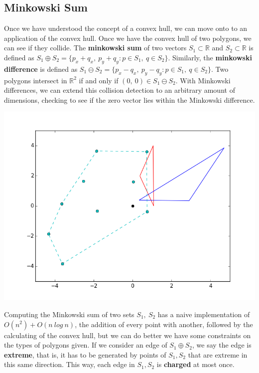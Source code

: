\documentclass[10pt]{article}
\begin{document}
\begin{multicols}{2}
\subsection{Minkowski Sum}
\indent Once we have understood the concept of a convex hull, we can move onto to an application of the convex hull. Once we have the convex hull of two polygons, we can see if they collide. The \textbf{minkowski sum} of two vectors $S_1 \subset \mathbb{R}$ and $S_2 \subset \mathbb{R}$ is defined as $S_1 \oplus S_2 = \{p_x + q_x,\ p_y + q_y : p \in S_1,\ q \in S_2\}$. Similarly, the \textbf{minkowski difference} is defined as $S_1 \ominus S_2 = \{p_x - q_x,\ p_y - q_y : p \in S_1,\ q \in S_2\}$. Two polygons intersect in $\mathbb{R}^2$ if and only if $(0,\ 0) \in S_1 \ominus S_2$. With Minkowski differences, we can extend this collision detection to an arbitrary amount of dimensions, checking to see if the zero vector lies within the Minkowski difference.
\centerline{\includegraphics[scale=0.4]{minkowski_colliding.png}} 
\indent Computing the Minkowski sum of two sets $S_1,\ S_2$ has a naive implementation of $O(n^2) + O(n\ log\ n)$, the addition of every point with another, followed by the calculating of the convex hull, but we can do better we have some constraints on the types of polygons given. If we consider an edge of $S_1 \oplus S_2$, we say the edge is \textbf{extreme}, that is, it has to be generated by points of $S_1, S_2$ that are extreme in this same direction. This way, each edge in $S_1, S_2$ is \textbf{charged} at most once.

\end{multicols}
\end{document}
